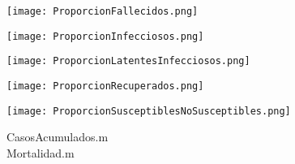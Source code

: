 \documentclass[11pt]{article}
\begin{document}
\begin{center}
    \texttt{[image: ProporcionFallecidos.png]}
    \caption{\\}
\end{center}  

\begin{center}
    \texttt{[image: ProporcionInfecciosos.png]}
    \caption{\\}
\end{center}  

\begin{center}
    \texttt{[image: ProporcionLatentesInfecciosos.png]}
    \caption{\\}
\end{center}  

\begin{center}
    \texttt{[image: ProporcionRecuperados.png]}
    \caption{\\}
\end{center}  

\begin{center}
    \texttt{[image: ProporcionSusceptiblesNoSusceptibles.png]}
    \caption{\\}
\end{center}  
\begin{tcolorbox}[colframe=blue!35!black, title=Código]
    CasosAcumulados.m
    \\
    Mortalidad.m
\end{tcolorbox}
\end{document}
